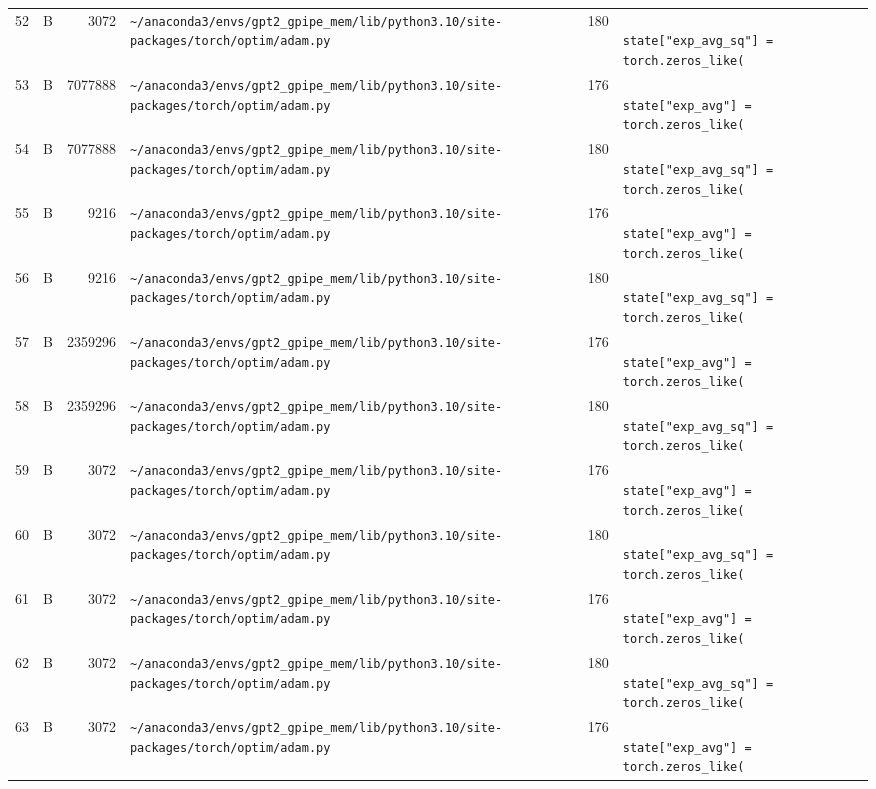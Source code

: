 \documentclass{article}
\begin{document}
\begin{longtable}{r l r p{6.5cm} r p{7.0cm}}
52 & B & 3072 & \lstinline|~/anaconda3/envs/gpt2_gpipe_mem/lib/python3.10/site-packages/torch/optim/adam.py| & 180 & \lstinline|                    state["exp_avg_sq"] = torch.zeros_like(| \\
53 & B & 7077888 & \lstinline|~/anaconda3/envs/gpt2_gpipe_mem/lib/python3.10/site-packages/torch/optim/adam.py| & 176 & \lstinline|                    state["exp_avg"] = torch.zeros_like(| \\
54 & B & 7077888 & \lstinline|~/anaconda3/envs/gpt2_gpipe_mem/lib/python3.10/site-packages/torch/optim/adam.py| & 180 & \lstinline|                    state["exp_avg_sq"] = torch.zeros_like(| \\
55 & B & 9216 & \lstinline|~/anaconda3/envs/gpt2_gpipe_mem/lib/python3.10/site-packages/torch/optim/adam.py| & 176 & \lstinline|                    state["exp_avg"] = torch.zeros_like(| \\
56 & B & 9216 & \lstinline|~/anaconda3/envs/gpt2_gpipe_mem/lib/python3.10/site-packages/torch/optim/adam.py| & 180 & \lstinline|                    state["exp_avg_sq"] = torch.zeros_like(| \\
57 & B & 2359296 & \lstinline|~/anaconda3/envs/gpt2_gpipe_mem/lib/python3.10/site-packages/torch/optim/adam.py| & 176 & \lstinline|                    state["exp_avg"] = torch.zeros_like(| \\
58 & B & 2359296 & \lstinline|~/anaconda3/envs/gpt2_gpipe_mem/lib/python3.10/site-packages/torch/optim/adam.py| & 180 & \lstinline|                    state["exp_avg_sq"] = torch.zeros_like(| \\
59 & B & 3072 & \lstinline|~/anaconda3/envs/gpt2_gpipe_mem/lib/python3.10/site-packages/torch/optim/adam.py| & 176 & \lstinline|                    state["exp_avg"] = torch.zeros_like(| \\
60 & B & 3072 & \lstinline|~/anaconda3/envs/gpt2_gpipe_mem/lib/python3.10/site-packages/torch/optim/adam.py| & 180 & \lstinline|                    state["exp_avg_sq"] = torch.zeros_like(| \\
61 & B & 3072 & \lstinline|~/anaconda3/envs/gpt2_gpipe_mem/lib/python3.10/site-packages/torch/optim/adam.py| & 176 & \lstinline|                    state["exp_avg"] = torch.zeros_like(| \\
62 & B & 3072 & \lstinline|~/anaconda3/envs/gpt2_gpipe_mem/lib/python3.10/site-packages/torch/optim/adam.py| & 180 & \lstinline|                    state["exp_avg_sq"] = torch.zeros_like(| \\
63 & B & 3072 & \lstinline|~/anaconda3/envs/gpt2_gpipe_mem/lib/python3.10/site-packages/torch/optim/adam.py| & 176 & \lstinline|                    state["exp_avg"] = torch.zeros_like(| \\

\end{longtable}
\end{document}
